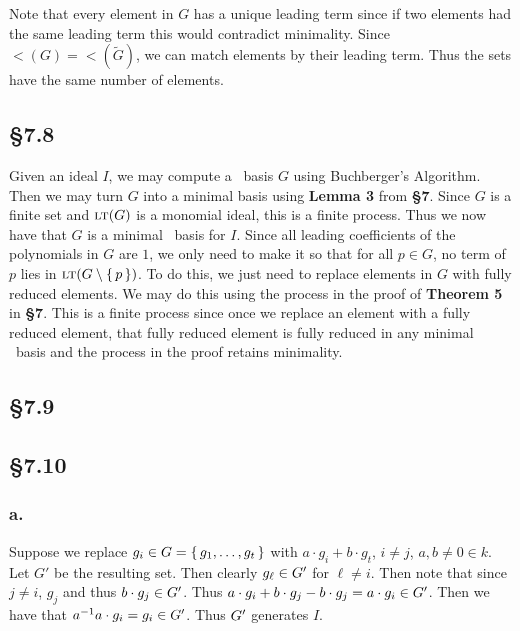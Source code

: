 \documentclass[letterpaper]{article}
\begin{document}
Note that every element in $G$ has a unique leading term since if two elements had the same leading term this would contradict minimality.
Since $\lt(G) = \lt(\tilde{G})$, we can match elements by their leading term.
Thus the sets have the same number of elements.

\subsection*{\S 7.8}

Given an ideal $I$, we may compute a \Grobner\ basis $G$ using Buchberger's Algorithm.
Then we may turn $G$ into a minimal basis using \textbf{Lemma 3} from \textbf{\S 7}.
Since $G$ is a finite set and $\gen{\lt(G)}$ is a monomial ideal, this is a finite process.
Thus we now have that $G$ is a minimal \Grobner\ basis for $I$.
Since all leading coefficients of the polynomials in $G$ are $1$, we only need to make it so that for all $p \in G$, no term of $p$ lies in $\gen{\lt(G \setminus \set{p})}$.
To do this, we just need to replace elements in $G$ with fully reduced elements.
We may do this using the process in the proof of \textbf{Theorem 5} in \textbf{\S 7}.
This is a finite process since once we replace an element with a fully reduced element, that fully reduced element is fully reduced in any minimal \Grobner\ basis and the process in the proof retains minimality.

\subsection*{\S 7.9}


\clearpage

\subsection*{\S 7.10}

\subsubsection*{a.}

Suppose we replace $g_{i} \in G = \set{g_{1}, \ldots, g_{t}}$ with $a \cdot g_{i} + b \cdot g_{t}$, $i \neq j$, $a,b \neq 0 \in k$.
Let $G'$ be the resulting set.
Then clearly $g_{\ell} \in \gen{G'}$ for $\ell \neq i$.
Then note that since $j \neq i$, $g_{j}$ and thus $b \cdot g_{j} \in \gen{G'}$.
Thus $a \cdot g_{i} + b \cdot g_{j} - b \cdot g_{j} = a \cdot g_{i} \in \gen{G'}$.
Then we have that $a^{-1} a \cdot g_{i} = g_{i} \in \gen{G'}$.
Thus $\gen{G'}$ generates $I$.
\end{document}
